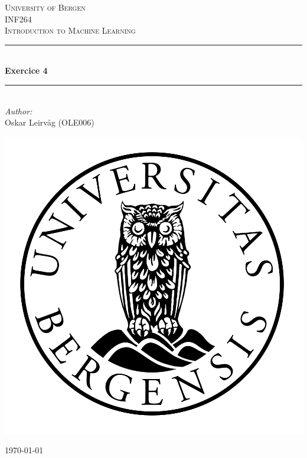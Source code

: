 \begin{titlepage}
    \newcommand{\HRule}{\rule{\linewidth}{0.5mm}}
    \center

    \textsc{\LARGE University of Bergen}\\[1.5cm] %
    \textsc{\Large INF264}\\[0.5cm] %
    \textsc{\large Introduction to Machine Learning}\\[0.5cm] %

    \HRule \\[0.4cm]
    { \huge \bfseries Exercice 4}\\[0.4cm] %
    \HRule \\[1.5cm]

    \Large \emph{Author:}\\
    Oskar Leirvåg (OLE006)
    \\[2cm] %

    \centerline{\includegraphics[scale=0.15]{figures/canvas}} %

    {\large \today}\\[3cm] %

    \vfill
\end{titlepage}
